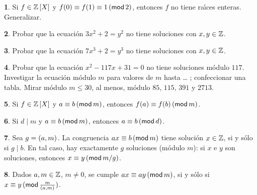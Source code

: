 \theoremstyle{definition}
\newtheorem{ejerCongruencias}{\ejername}[section]


\begin{ejerCongruencias}
	Si $f\in\polinomios\Enteros{X}$ y $f(0)\equiv f(1)\equiv 1\tmodulo[2]$,
	entonces $f$ no tiene ra\'{\i}ces enteras. Generalizar.
\end{ejerCongruencias}

\begin{ejerCongruencias}
	Probar que la ecuaci\'on $3x^2+2=y^2$ no tiene soluciones con
	$x,y\in\Enteros$.
\end{ejerCongruencias}

\begin{ejerCongruencias}
	Probar que la ecuaci\'on $7x^3+2=y^3$ no tiene soluciones con
	$x,y\in\Enteros$.
\end{ejerCongruencias}

\begin{ejerCongruencias}
	Probar que la ecuaci\'on $x^2-117x+31=0$ no tiene soluciones m\'odulo
	$117$. Investigar la ecuaci\'on m\'odulo $m$ para valores de $m$
	hasta \dots%
	; confeccionar una tabla. Mirar m\'odulo $m\leq 30$, al menos,
	m\'odulo $85$, $115$, $391$ y $2713$.
\end{ejerCongruencias}

\begin{ejerCongruencias}
	Si $f\in\polinomios\Enteros{X}$ y $a\equiv b\tmodulo[m]$, entonces
	$f(a)\equiv f(b)\tmodulo[m]$.
\end{ejerCongruencias}

\begin{ejerCongruencias}
	Si $d\mid m$ y $a\equiv b\tmodulo[m]$, entonces $a\equiv b\tmodulo[d]$.
\end{ejerCongruencias}

\begin{ejerCongruencias}
	Sea $g=\mcd{a,m}$. La congruencia $ax\equiv b\tmodulo[m]$ tiene
	soluci\'on $x\in\Enteros$, si y s\'olo si $g\mid b$. En tal caso,
	hay exactamente $g$ soluciones (m\'odulo $m$):
	si $x$ e $y$ son soluciones, entonces $x\equiv y\tmodulo[m/g]$.
\end{ejerCongruencias}

\begin{ejerCongruencias}
	Dados $a,m\in\Enteros$, $m\neq 0$, se cumple $ax\equiv ay\tmodulo[m]$,
	si y s\'olo si $x\equiv y\tmodulo[\tfrac m{\mcd{a,m}}]$.
\end{ejerCongruencias}

